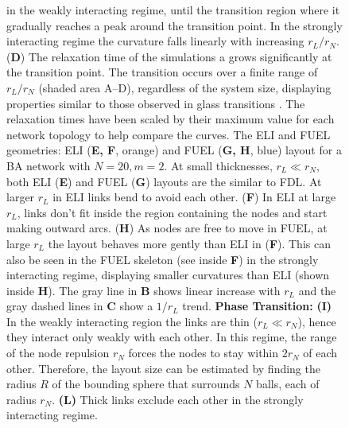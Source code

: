 \documentclass[endfloats,nofootinbib,preprint,floatfix,titlepage,superscriptaddress,linenumbers]{revtex4-1} %
\begin{document}
\begin{figure}
{{    in the weakly interacting regime, until the transition region where it gradually reaches a peak around the transition point. 
    In the strongly interacting regime the curvature falls linearly with increasing $r_L/r_N$. 
    }%
    ({\bf D}) The relaxation time of the simulations a grows significantly at the transition point. %
    The transition occurs over  a finite range of $r_L/r_N$ (shaded area A--D), regardless of the system size, displaying properties similar to those observed in glass transitions \cite{gibbs1958nature}.  
    The relaxation times have been scaled by their maximum value for each network topology to help compare the curves.
    The ELI and FUEL geometries: 
    ELI ({\bf E, F}, orange) and FUEL ({\bf G, H}, blue) layout for a BA network \cite{barabasi1999emergence} with $N=20, m=2$. 
    At small thicknesses, $r_L \ll r_N$, both ELI ({\bf E}) and FUEL ({\bf G}) layouts are the similar to FDL. 
    At larger $r_L$ in ELI links bend to avoid each other. 
    ({\bf F}) In ELI at large $r_L$, links don't fit inside the region containing the nodes and start making outward arcs. 
    { 
    ({\bf H}) As nodes are free to move in FUEL, at large $r_L$ the layout behaves more gently than ELI in ({\bf F}). 
    This can also be seen in the FUEL skeleton (see inside {\bf F}) in the strongly interacting regime, displaying smaller curvatures than ELI (shown inside {\bf H}).
    }
    The gray line in {\bf B} shows linear increase with $r_L$ and the gray dashed lines in {\bf C} show a $1/r_L$ trend.
    { 
    {\bf Phase Transition:} 
    {\bf (I)} In the weakly interacting region the links are thin ($r_L\ll r_N$), hence they interact only weakly with each other. 
    In this regime, the range of the node repulsion $r_N$ forces the nodes to stay within $2r_N$ of each other. 
    Therefore, the layout size can be estimated by finding the radius $R$ of the bounding sphere that surrounds $N$ balls, each of radius $r_N$. 
    {\bf (L)} Thick links exclude each other  in the strongly interacting regime. 
}}
\end{figure}
\end{document}
